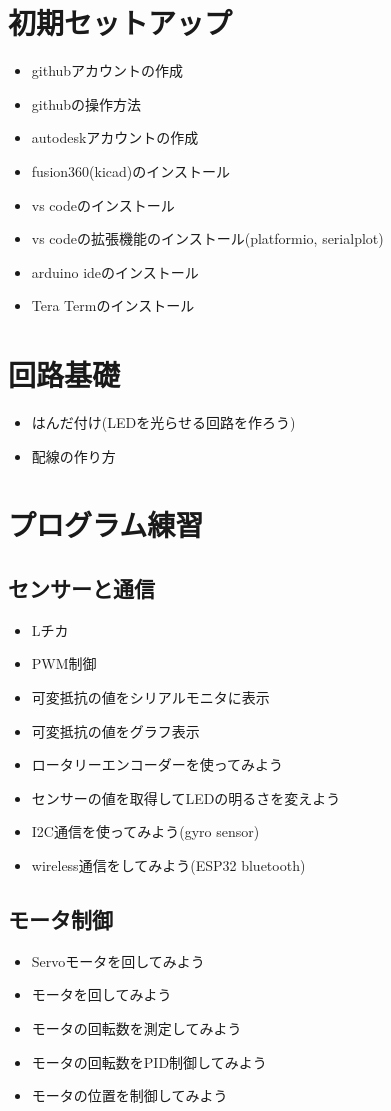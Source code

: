 \documentclass[a4paper,11pt]{ltjsarticle}
\newcommand{\checkbox}[1]{
      \item[$\Box$] #1
  }
\begin{document}
\section{初期セットアップ}
\begin{itemize}
    \checkbox{githubアカウントの作成}
    \checkbox{githubの操作方法}
    \checkbox{autodeskアカウントの作成}
    \checkbox{fusion360(kicad)のインストール}
    \checkbox{vs codeのインストール}
    \checkbox{vs codeの拡張機能のインストール(platformio, serialplot)}
    \checkbox{arduino ideのインストール}
    \checkbox{Tera Termのインストール}
\end{itemize}
\section{回路基礎}
\begin{itemize}
    \checkbox{はんだ付け(LEDを光らせる回路を作ろう)}
    \checkbox{配線の作り方}
\end{itemize}
\section{プログラム練習}
\subsection{センサーと通信}
\begin{itemize}
    \checkbox{Lチカ}
    \checkbox{PWM制御}
    \checkbox{可変抵抗の値をシリアルモニタに表示}
    \checkbox{可変抵抗の値をグラフ表示}
    \checkbox{ロータリーエンコーダーを使ってみよう}
    \checkbox{センサーの値を取得してLEDの明るさを変えよう}
    \checkbox{I2C通信を使ってみよう(gyro sensor)}
    \checkbox{wireless通信をしてみよう(ESP32 bluetooth)}
\end{itemize}
\subsection{モータ制御}
\begin{itemize}
    \checkbox{Servoモータを回してみよう}
    \checkbox{モータを回してみよう}
    \checkbox{モータの回転数を測定してみよう}
    \checkbox{モータの回転数をPID制御してみよう}
    \checkbox{モータの位置を制御してみよう}
\end{itemize}
\end{document}
